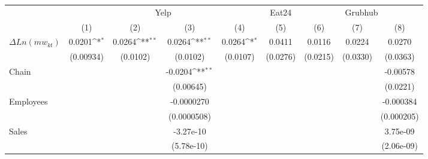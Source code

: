 {
\def\sym#1{\ifmmode^{#1}\else\(^{#1}\)\fi}
\begin{tabular}{l*{8}{c}}
\hline\hline
&\multicolumn{4}{c}{Yelp}&\multicolumn{1}{c}{Eat24} &\multicolumn{3}{c}{Grubhub} \\
                    &\multicolumn{1}{c}{(1)}&\multicolumn{1}{c}{(2)}&\multicolumn{1}{c}{(3)}&\multicolumn{1}{c}{(4)}&\multicolumn{1}{c}{(5)}&\multicolumn{1}{c}{(6)}&\multicolumn{1}{c}{(7)}&\multicolumn{1}{c}{(8)}\\
\hline
$\Delta Ln(mw_{kt}) $&      0.0201\sym{*}  &      0.0264\sym{**} &      0.0264\sym{**} &      0.0264\sym{*}  &      0.0411      &      0.0116     &      0.0224         &      0.0270      \\
                    &   (0.00934)         &    (0.0102)         &    (0.0102)         &    (0.0107)         &    (0.0276)      &    (0.0215)         &    (0.0330)         &    (0.0363)        \\
[1em]
Chain               &                     &                     &     -0.0204\sym{**} &                     &                     &                     &                     &    -0.00578    \\
                    &                     &                     &   (0.00645)         &                     &                       &                     &                     &    (0.0221)    \\
[1em]
Employees           &                     &                     &  -0.0000270         &                     &                     &                     &                     &   -0.000384  \\
                    &                     &                     & (0.0000508)         &                     &                      &                     &                     &  (0.000205)        \\
[1em]
Sales               &                     &                     &   -3.27e-10         &                     &                     &                     &                     &    3.75e-09  \\
                    &                     &                     &  (5.78e-10)         &                     &                      &                     &                     &  (2.06e-09)   \\

\end{tabular}}
